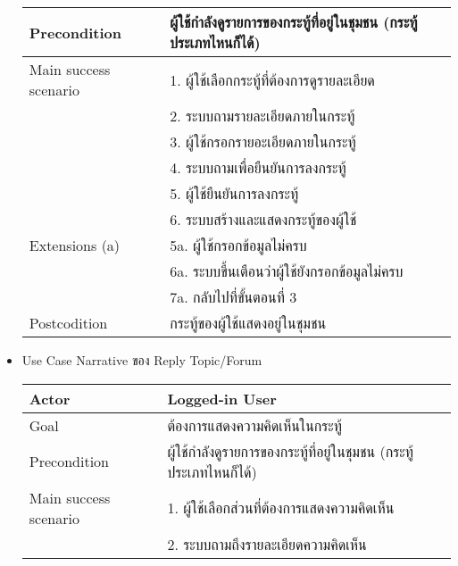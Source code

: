 \begin{itemize}
\begin{table}[!h]
\begin{tabular}{|l|l|}
                  Precondition          & ผู้ใช้กำลังดูรายการของกระทู้ที่อยู่ในชุมชน (กระทู้ประเภทไหนก็ได้) \\ \hline
                  Main success scenario & 1. ผู้ใช้เลือกกระทู้ที่ต้องการดูรายละเอียด                  \\
                                        & 2. ระบบถามรายละเอียดภายในกระทู้                     \\
                                        & 3. ผู้ใช้กรอกรายอะเอียดภายในกระทู้                     \\
                                        & 4. ระบบถามเพื่อยืนยันการลงกระทู้                       \\
                                        & 5. ผู้ใช้ยืนยันการลงกระทู้                              \\
                                        & 6. ระบบสร้างและแสดงกระทู้ของผู้ใช้                     \\ \hline
                  Extensions (a)        & 5a. ผู้ใช้กรอกข้อมูลไม่ครบ                             \\
                                        & 6a. ระบบขึ้นเตือนว่าผู้ใช้ยังกรอกข้อมูลไม่ครบ               \\
                                        & 7a. กลับไปที่ขั้นตอนที่ 3                               \\ \hline
                  Postcodition          & กระทู้ของผู้ใช้แสดงอยู่ในชุมชน                           \\ \hline
              \end{tabular}
          \end{table}
    \item Use Case Narrative ของ Reply Topic/Forum
          \begin{table}[!h]
              \begin{tabular}{|l|l|} \hline
                  Actor                 & Logged-in User                                   \\ \hline
                  Goal                  & ต้องการแสดงความคิดเห็นในกระทู้                        \\ \hline
                  Precondition          & ผู้ใช้กำลังดูรายการของกระทู้ที่อยู่ในชุมชน (กระทู้ประเภทไหนก็ได้) \\ \hline
                  Main success scenario & 1. ผู้ใช้เลือกส่วนที่ต้องการแสดงความคิดเห็น                \\
                                        & 2. ระบบถามถึงรายละเอียดความคิดเห็น                   \\

\end{tabular}
\end{table}
\end{itemize}
